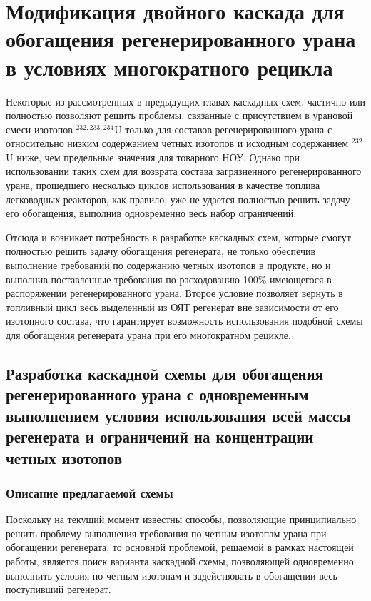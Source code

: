 \chapter{Модификация двойного каскада для обогащения регенерированного урана в условиях многократного рецикла}\label{ch:ch3}

Некоторые из рассмотренных в предыдущих главах каскадных схем, частично или полностью позволяют решить проблемы, связанные с присутствием в урановой смеси изотопов $^{232,233,234}$U только для составов регенерированного урана с относительно низким содержанием четных изотопов и исходным содержанием $^{232}$U ниже, чем предельные значения для товарного НОУ. Однако при использовании таких схем для возврата состава загрязненного регенерированного урана, прошедшего несколько циклов использования в качестве топлива легководных реакторов, как правило, уже не удается полностью решить задачу его обогащения, выполнив одновременно весь набор ограничений.

Отсюда и возникает потребность в разработке каскадных схем, которые смогут полностью решить задачу обогащения регенерата, не только обеспечив выполнение требований по содержанию четных изотопов в продукте, но и выполнив поставленные требования по расходованию 100\% имеющегося в распоряжении регенерированного урана. Второе условие позволяет вернуть в топливный цикл весь выделенный из ОЯТ регенерат вне зависимости от его изотопного состава, что гарантирует возможность использования подобной схемы для обогащения регенерата урана при его многократном рецикле.

\section{Разработка каскадной схемы для обогащения регенерированного урана с одновременным выполнением условия использования всей массы регенерата и ограничений на концентрации четных изотопов}
\subsection{Описание предлагаемой схемы}

Поскольку на текущий момент известны способы, позволяющие принципиально решить проблему выполнения требования по четным изотопам урана при обогащении регенерата, то основной проблемой, решаемой в рамках настоящей работы, является поиск варианта каскадной схемы, позволяющей одновременно выполнить условия по четным изотопам и задействовать в обогащении весь поступивший регенерат.

